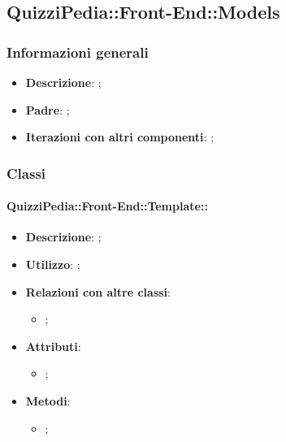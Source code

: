 \newpage

\subsection{QuizziPedia::Front-End::Models}

	\subsubsection{Informazioni generali}
		\begin{itemize}
			\item \textbf{Descrizione}: ;
			\item \textbf{Padre}: ;
			\item \textbf{Iterazioni con altri componenti}: ;
		\end{itemize}
	
	\subsubsection{Classi}
		\paragraph{QuizziPedia::Front-End::Template::}
			\begin{itemize}
				\item \textbf{Descrizione}: ;
				\item \textbf{Utilizzo}: ;
				\item \textbf{Relazioni con altre classi}: 
				\begin{itemize}
					\item ;
				\end{itemize}
				\item \textbf{Attributi}: 
				\begin{itemize}
					\item ;
				\end{itemize}
				\item \textbf{Metodi}: 
				\begin{itemize}
					\item ;
				\end{itemize}
			\end{itemize}																						